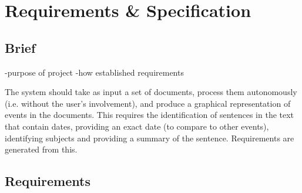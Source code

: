\chapter{Requirements \& Specification}
\section{Brief}
-purpose of project
-how established requirements
\par The system should take as input a set of documents, process them autonomously (i.e. without the user's involvement), and produce a graphical representation of events in the documents. This requires the identification of sentences in the text that contain dates, providing an exact date (to compare to other events), identifying subjects and providing a summary of the sentence. Requirements are generated from this.

\section {Requirements}
